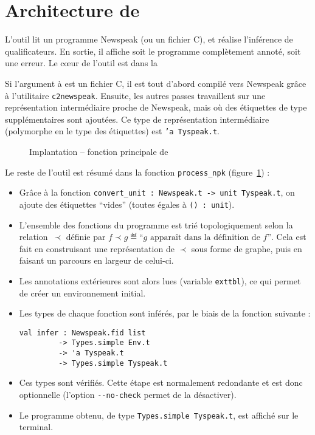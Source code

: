 \clearpage

\section{Architecture de \ptrtype}

L'outil \ptrtype lit un programme Newspeak (ou un fichier C), et réalise
l'inférence de qualificateurs. En sortie, il affiche soit le programme
complètement annoté, soit une erreur. Le cœur de l'outil est dans la

Si l'argument à \ptrtype est un fichier C, il est tout d'abord compilé vers
Newspeak grâce à l'utilitaire \texttt{c2newspeak}. Ensuite, les autres passes
travaillent sur une représentation intermédiaire proche de Newspeak, mais où des
étiquettes de type supplémentaires sont ajoutées. Ce type de représentation
intermédiaire (polymorphe en le type des étiquettes) est \texttt{'a Tyspeak.t}.

\begin{figure}
\caption{Implantation -- fonction principale de \ptrtype}
\label{fig:implem-process}
\end{figure}

Le reste de l'outil est résumé dans la fonction
\texttt{process\_npk} (figure~\ref{fig:implem-process}) :

\begin{itemize}

\item Grâce à la fonction \texttt{convert_unit : Newspeak.t -> unit Tyspeak.t},
  on ajoute des étiquettes ``vides'' (toutes égales à \texttt{() : unit}).

\item L'ensemble des fonctions du programme est trié topologiquement selon la
  relation~$\prec$ définie par $f \prec g \eqdef \textrm{``} g
  \textrm{ apparaît dans la définition de } f \textrm{''}$. Cela est fait en
  construisant une représentation de $\prec$ sous forme de graphe, puis en
  faisant un parcours en largeur de celui-ci.

\item Les annotations extérieures sont alors lues (variable \texttt{exttbl}), ce
  qui permet de créer un environnement initial.

\item Les types de chaque fonction sont inférés, par le biais de la fonction
  suivante :

\begin{Verbatim}
val infer : Newspeak.fid list
         -> Types.simple Env.t
         -> 'a Tyspeak.t
         -> Types.simple Tyspeak.t
\end{Verbatim}

\item Ces types sont vérifiés. Cette étape est normalement redondante et est
  donc optionnelle (l'option \texttt{-{}-no-check} permet de la désactiver).

\item Le programme obtenu, de type \texttt{Types.simple Tyspeak.t}, est affiché
  sur le terminal.

\end{itemize}

